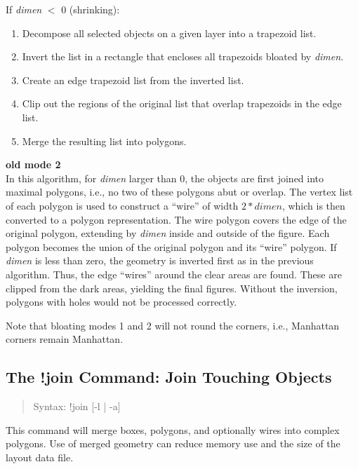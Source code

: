 \begin{description}
\begin{description}
\item{If {\it dimen} $<$ 0 (shrinking):}\\
\begin{enumerate}
\item{Decompose all selected objects on a given layer into a
trapezoid list.}
\item{Invert the list in a rectangle that encloses all trapezoids
bloated by {\it dimen}.}
\item{Create an edge trapezoid list from the inverted list.}
\item{Clip out the regions of the original list that overlap
trapezoids in the edge list.}
\item{Merge the resulting list into polygons.}
\end{enumerate}
\end{description}

\item{\bf old mode 2}\\
In this algorithm, for {\it dimen} larger than 0, the objects are
first joined into maximal polygons, i.e., no two of these polygons
abut or overlap.  The vertex list of each polygon is used to construct
a ``wire'' of width $2*dimen$, which is then converted to a polygon
representation.  The wire polygon covers the edge of the original
polygon, extending by {\it dimen} inside and outside of the figure. 
Each polygon becomes the union of the original polygon and its
``wire'' polygon.  If {\it dimen} is less than zero, the geometry is
inverted first as in the previous algorithm.  Thus, the edge ``wires''
around the clear areas are found.  These are clipped from the dark
areas, yielding the final figures.  Without the inversion, polygons
with holes would not be processed correctly.

Note that bloating modes 1 and 2 will not round the corners, i.e.,
Manhattan corners remain Manhattan.
\end{description}

\subsection{The {\cb !join} Command: Join Touching Objects}
\label{joincmd}
\begin{quote}
Syntax: {\vt !join} [{\vt -l} {\vt |} {\vt -a}]

\end{quote}
This command will merge boxes, polygons, and optionally wires into
complex polygons.  Use of merged geometry can reduce memory use and
the size of the layout data file.

